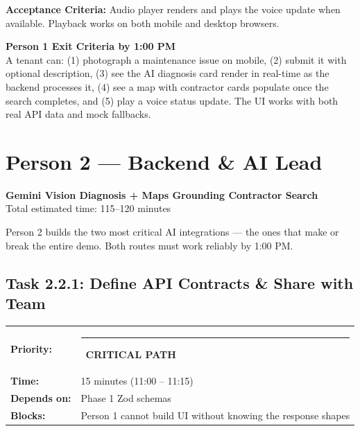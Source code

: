 \documentclass[11pt, a4paper]{article}
\newcommand{\critical}{\textcolor{critred}{\rule{6pt}{6pt}}~\textcolor{critred}{\scriptsize\textbf{CRITICAL PATH}}}
\begin{document}
\textbf{Acceptance Criteria:} Audio player renders and plays the voice update when available. Playback works on both mobile and desktop browsers.

\vspace{0.5em}

\begin{milestonebox}
\textbf{Person 1 Exit Criteria by 1:00 PM}\\[4pt]
A tenant can: (1) photograph a maintenance issue on mobile, (2) submit it with optional description, (3) see the AI diagnosis card render in real-time as the backend processes it, (4) see a map with contractor cards populate once the search completes, and (5) play a voice status update. The UI works with both real API data and mock fallbacks.
\end{milestonebox}

\newpage

\section{Person 2 --- Backend \& AI Lead}
\begin{center}
\textcolor{medteal}{\large\textbf{Gemini Vision Diagnosis + Maps Grounding Contractor Search}}\\[2pt]
\textcolor{textmuted}{\small Total estimated time: 115--120 minutes}
\end{center}

\vspace{0.5em}

Person 2 builds the two most critical AI integrations --- the ones that make or break the entire demo. Both routes must work reliably by 1:00 PM.

\vspace{0.5em}

\subsection{Task 2.2.1: Define API Contracts \& Share with Team}

\begin{tabularx}{\textwidth}{lX}
\textbf{Priority:} & \critical \\
\textbf{Time:} & 15 minutes (11:00 -- 11:15) \\
\textbf{Depends on:} & Phase 1 Zod schemas \\
\textbf{Blocks:} & Person 1 cannot build UI without knowing the response shapes \\
\end{tabularx}
\end{document}
